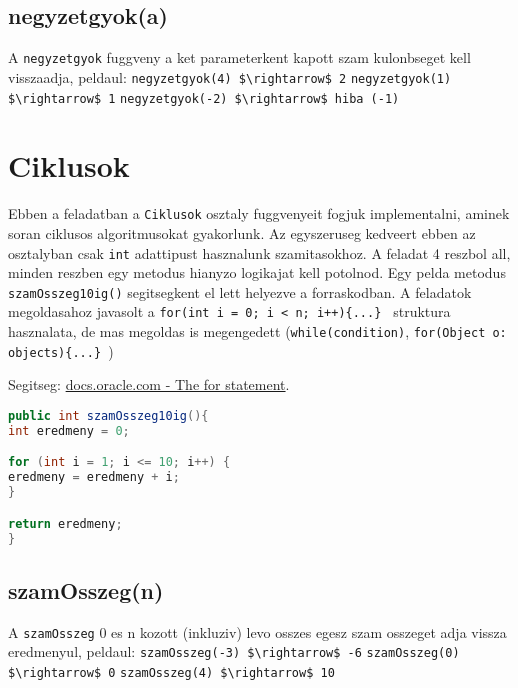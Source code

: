 \documentclass{article}
\begin{document}
\subsection{negyzetgyok(a)}
A \lstinline{negyzetgyok} fuggveny a ket parameterkent kapott szam kulonbseget kell visszaadja,
peldaul:\newline
\lstinline[mathescape]{negyzetgyok(4) $\rightarrow$ 2}\newline
\lstinline[mathescape]{negyzetgyok(1) $\rightarrow$ 1}\newline
\lstinline[mathescape]{negyzetgyok(-2) $\rightarrow$ hiba (-1)}\newline

\newpage
\section{Ciklusok}

Ebben a feladatban a \lstinline{Ciklusok} osztaly fuggvenyeit fogjuk implementalni, aminek soran ciklusos algoritmusokat gyakorlunk. Az egyszeruseg kedveert ebben az osztalyban csak \lstinline{int} adattipust hasznalunk szamitasokhoz. A feladat 4 reszbol all, minden reszben egy metodus hianyzo logikajat kell potolnod. Egy pelda metodus \lstinline{szamOsszeg10ig()} segitsegkent el lett helyezve a forraskodban. A feladatok megoldasahoz javasolt a \lstinline|for(int i = 0; i < n; i++){...} | struktura hasznalata, de mas megoldas is megengedett (\lstinline{while(condition)}, \newline \lstinline|for(Object o: objects){...} |)\

Segitseg: \href{https://docs.oracle.com/javase/tutorial/java/nutsandbolts/for.html}{docs.oracle.com - The for statement}.

\begin{lstlisting}[language=Java, caption=Pelda Metodus]
public int szamOsszeg10ig(){
int eredmeny = 0;

for (int i = 1; i <= 10; i++) {
eredmeny = eredmeny + i;
}

return eredmeny;
}
\end{lstlisting}

\subsection{szamOsszeg(n)}
A \lstinline{szamOsszeg} 0 es n kozott (inkluziv) levo osszes egesz szam osszeget adja vissza eredmenyul, peldaul:\newline
\lstinline[mathescape]{szamOsszeg(-3) $\rightarrow$ -6}\newline
\lstinline[mathescape]{szamOsszeg(0) $\rightarrow$ 0}\newline
\lstinline[mathescape]{szamOsszeg(4) $\rightarrow$ 10}\newline
\end{document}
